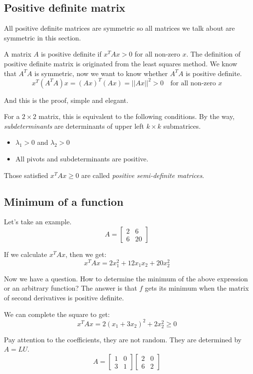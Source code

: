 \documentclass[10pt,a4paper,oneside,numbers=noenddot]{scrbook}
\theoremstyle{ctplain}
\theoremstyle{ctresult}
\begin{document}
\subsection{Positive definite matrix}

All positive definite matrices are symmetric so all matrices we talk about are symmetric
in this section.


A matrix $A$ is positive definite if $x^{T}Ax > 0$ for all non-zero $x$. The
definition of positive definite matrix is originated from the least squares method.
We know that $A^{T}A$ is symmetric, now we want to know whether $A^{T}A$ is positive
definite.
\[
  x^{T}(A^{T}A)x = (Ax)^{T}(Ax) = ||Ax||^{2} > 0 \quad \text{for all non-zero } x
\]

And this is the proof, simple and elegant.

For a $2 \times 2$ matrix, this is equivalent to the following conditions. By the way,
\emph{subdeterminants} are determinants of upper left $k \times k$ submatrices.
\begin{itemize}
  \item $\lambda_1 > 0$ and $\lambda_2 > 0$
  \item All pivots and subdeterminants are positive.
\end{itemize}

Those satisfied $x^{T}Ax \geq 0$ are called \emph{positive semi-definite matrices}.

\subsection{Minimum of a function}

Let's take an example.
\[
  A = \begin{bmatrix}
    2 & 6 \\
    6 & 20
  \end{bmatrix}
\]

If we calculate $x^{T}Ax$, then we get:
\[
  x^{T}Ax = 2x_1^2 + 12x_1x_2 + 20x_2^2
\]

Now we have a question. How to determine the minimum of the above expression or an
arbitrary function? The answer is that $f$ gets its minimum when the matrix of second
derivatives is positive definite.

We can complete the square to get:
\[
  x^{T}Ax = 2(x_1 + 3x_2)^2 + 2x_2^2 \geq 0
\]

Pay attention to the coefficients, they are not random. They are determined by $A = LU$.
\[
  A = \begin{bmatrix}
    1 & 0 \\
    3 & 1
  \end{bmatrix}
  \begin{bmatrix}
    2 & 0 \\
    6 & 2
  \end{bmatrix}
\]
\end{document}
